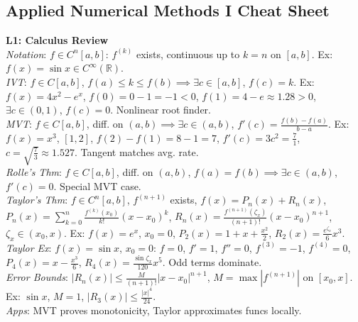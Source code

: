 \documentclass[9pt]{article}
\begin{document}
\begin{multicols}{3}

\section*{Applied Numerical Methods I Cheat Sheet}

\textbf{L1: Calculus Review} \\
\textit{Notation}: $f \in C^n[a,b]$: $f^{(k)}$ exists, continuous up to $k=n$ on $[a,b]$. Ex: $f(x)=\sin x \in C^\infty(\mathbb{R})$. \\
\textit{IVT}: $f \in C[a,b]$, $f(a) \leq k \leq f(b) \implies \exists c \in [a,b]$, $f(c)=k$. Ex: $f(x)=4x^2-e^x$, $f(0)=0-1=-1<0$, $f(1)=4-e \approx 1.28>0$, $\exists c \in (0,1)$, $f(c)=0$. Nonlinear root finder. \\
\textit{MVT}: $f \in C[a,b]$, diff. on $(a,b) \implies \exists c \in (a,b)$, $f'(c)=\frac{f(b)-f(a)}{b-a}$. Ex: $f(x)=x^3$, $[1,2]$, $f(2)-f(1)=8-1=7$, $f'(c)=3c^2=\frac{7}{1}$, $c=\sqrt{\frac{7}{3}} \approx 1.527$. Tangent matches avg. rate. \\
\textit{Rolle’s Thm}: $f \in C[a,b]$, diff. on $(a,b)$, $f(a)=f(b) \implies \exists c \in (a,b)$, $f'(c)=0$. Special MVT case. \\
\textit{Taylor’s Thm}: $f \in C^n[a,b]$, $f^{(n+1)}$ exists, $f(x)=P_n(x)+R_n(x)$, $P_n(x)=\sum_{k=0}^n \frac{f^{(k)}(x_0)}{k!}(x-x_0)^k$, $R_n(x)=\frac{f^{(n+1)}(\zeta_x)}{(n+1)!}(x-x_0)^{n+1}$, $\zeta_x \in (x_0,x)$. Ex: $f(x)=e^x$, $x_0=0$, $P_2(x)=1+x+\frac{x^2}{2}$, $R_2(x)=\frac{e^{\zeta_x}}{6}x^3$. \\
\textit{Taylor Ex}: $f(x)=\sin x$, $x_0=0$: $f=0$, $f'=1$, $f''=0$, $f^{(3)}=-1$, $f^{(4)}=0$, $P_4(x)=x-\frac{x^3}{6}$, $R_4(x)=\frac{\sin \zeta_x}{120}x^5$. Odd terms dominate. \\
\textit{Error Bounds}: $|R_n(x)| \leq \frac{M}{(n+1)!}|x-x_0|^{n+1}$, $M=\max |f^{(n+1)}|$ on $[x_0,x]$. Ex: $\sin x$, $M=1$, $|R_3(x)| \leq \frac{|x|^4}{24}$. \\
\textit{Apps}: MVT proves monotonicity, Taylor approximates funcs locally.


\end{multicols}
\end{document}
